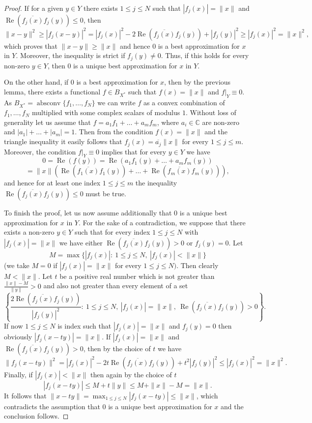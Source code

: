 \documentclass[12pt, reqno]{amsart}
\theoremstyle{definition}
\theoremstyle{remark}
\numberwithin{equation}{section}
\DeclareMathOperator{\absconv}{absconv}
\DeclareMathOperator{\re}{Re}
\begin{document}
\begin{proof}
If for a given $y \in Y$ there exists $1 \leq j \leq N$ such that $|f_j(x)|=\|x\|$ and $\re \left ( \overline{f_j(x)}f_j(y) \right ) \leq 0$, then
$$\|x-y\|^2 \geq |f_j(x-y)|^2 = |f_j(x)|^2 - 2\re\left ( \overline{f_j(x)}f_j(y) \right ) + |f_j(y)|^2 \geq |f_j(x)|^2= \|x\|^2,$$
which proves that $\|x-y\| \geq \|x\|$ and hence $0$ is a best approximation for $x$ in $Y$. Moreover, the inequality is strict if $f_j(y) \neq 0$. Thus, if this holds for every non-zero $y \in Y$, then $0$ is a unique best approximation for $x$ in $Y$.

On the other hand, if $0$ is a best approximation for $x$, then by the previous lemma, there exists a functional $f \in B_{X^*}$ such that $f(x)=\|x\|$ and $f|_{Y} \equiv 0$. As $B_{X^*} = \absconv \{f_1, \ldots, f_N\}$ we can write $f$ as a convex combination of $f_1, \ldots, f_N$ multiplied with some complex scalars of modulus $1$. Without loss of generality let us assume that $f = a_1f_1 + \ldots + a_mf_m$, where $a_i \in \mathbb{C}$ are non-zero and $|a_1| + \ldots + |a_m|=1$. Then from the condition $f(x)=\|x\|$ and the triangle inequality it easily follows that $f_j(x)=\overline{a_j}\|x\|$ for every $1 \leq j \leq m$. Moreover, the condition $f|_Y \equiv 0$ implies that for every $y \in Y$ we have
$$0  = \re(f(y)) = \re(a_1f_1(y) + \ldots + a_mf_m(y))$$
$$=\|x\|\left ( \re\left ( \overline{f_1(x)}f_1(y) \right ) + \ldots + \re\left ( \overline{f_m(x)}f_m(y) \right )\right ),$$
and hence for at least one index $1 \leq j \leq m$ the inequality $\re(\overline{f_j(x)}f_j(y)) \leq 0$ must be true. 

To finish the proof, let us now assume additionally that $0$ is a unique best approximation for $x$ in $Y$. For the sake of a contradiction, we suppose that there exists a non-zero $y \in Y$ such that for every index $1 \leq j \leq N$ with $|f_j(x)|=\|x\|$ we have either  $\re(\overline{f_j(x)}f_j(y)) > 0$ or $f_j(y)=0$. Let 
$$M = \max \{|f_j(x)|: \ 1 \leq j \leq N, \ |f_j(x)|<\|x\| \}$$
(we take $M=0$ if $|f_j(x)|=\|x\|$ for every $1 \leq j \leq N)$. Then clearly $M < \|x\|$. Let $t$ be a positive real number which is not greater than $\frac{\|x\|-M}{\|y\|}>0$ and also not greater than every element of a set 
$$\left \{ \frac{2\re \left ( \overline{f_j(x)}f_j(y) \right )}{|f_j(y)|^2}: \ 1 \leq j \leq N, \ |f_j(x)|=\|x\|, \ \re\left ( \overline{f_j(x)}f_j(y) \right )>0 \right \}.$$ 
If now $1 \leq j \leq N$ is index such that $|f_j(x)|=\|x\|$ and $f_j(y)=0$ then obviously $|f_j(x-ty)|=\|x\|$. If $|f_j(x)|=\|x\|$ and $\re \left (\overline{f_j(x)}f_j(y) \right )>0$, then by the choice of $t$ we have
$$\|f_j(x-ty)\|^2 = |f_j(x)|^2 - 2t\re \left ( \overline{f_j(x)}f_j(y) \right ) + t^2|f_j(y)|^2 \leq |f_j(x)|^2=\|x\|^2.$$
Finally, if $|f_j(x)| < \|x\|$ then again by the choice of $t$
$$|f_j(x-ty)| \leq M + t\|y\| \leq  M + \|x\|-M=\|x\|.$$
It follows that $\|x-ty\|=\max_{1 \leq j \leq N} |f_j(x-ty)| \leq \|x\|$, which contradicts the assumption that $0$ is a unique best approximation for $x$ and the conclusion follows.
\end{proof}
\end{document}
